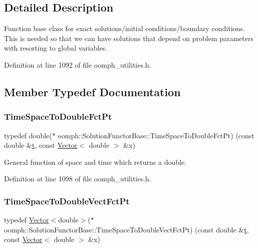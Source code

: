 \subsection{Detailed Description}
Function base class for exact solutions/initial conditions/boundary conditions. This is needed so that we can have solutions that depend on problem parameters with resorting to global variables. 

Definition at line 1092 of file oomph\+\_\+utilities.\+h.



\subsection{Member Typedef Documentation}
\mbox{\label{classoomph_1_1SolutionFunctorBase_a6da5b9aea59f09e01378860ff559c3bb}} 
\subsubsection{\texorpdfstring{Time\+Space\+To\+Double\+Fct\+Pt}{TimeSpaceToDoubleFctPt}}
{\footnotesize\ttfamily typedef double($\ast$ oomph\+::\+Solution\+Functor\+Base\+::\+Time\+Space\+To\+Double\+Fct\+Pt) (const double \&\hyperlink{cfortran_8h_af6f0bd3dc13317f895c91323c25c2b8f}{t}, const \hyperlink{classoomph_1_1Vector}{Vector}$<$ double $>$ \&x)}



General function of space and time which returns a double. 



Definition at line 1098 of file oomph\+\_\+utilities.\+h.

\mbox{\label{classoomph_1_1SolutionFunctorBase_a6df07384ce36c784c7befe7d7bf4a606}} 
\subsubsection{\texorpdfstring{Time\+Space\+To\+Double\+Vect\+Fct\+Pt}{TimeSpaceToDoubleVectFctPt}}
{\footnotesize\ttfamily typedef \hyperlink{classoomph_1_1Vector}{Vector}$<$double$>$($\ast$ oomph\+::\+Solution\+Functor\+Base\+::\+Time\+Space\+To\+Double\+Vect\+Fct\+Pt) (const double \&\hyperlink{cfortran_8h_af6f0bd3dc13317f895c91323c25c2b8f}{t}, const \hyperlink{classoomph_1_1Vector}{Vector}$<$ double $>$ \&x)}



